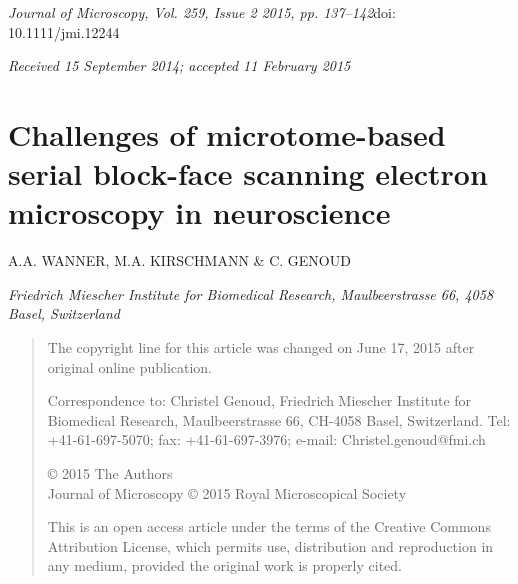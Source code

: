 \documentclass{article}
\begin{document}

\noindent\emph{Journal of Microscopy, Vol. 259, Issue 2 2015, pp. 137–142}\hfill doi: 10.1111/jmi.12244\par
\noindent\emph{Received 15 September 2014; accepted 11 February 2015}\par

\section*{Challenges of microtome-based serial block-face scanning electron microscopy in neuroscience}

\noindent A.A. WANNER, M.A. KIRSCHMANN \& C. GENOUD\par
\noindent\emph{Friedrich Miescher Institute for Biomedical Research, Maulbeerstrasse 66, 4058 Basel, Switzerland}\par

\begin{quote}\small
\noindent The copyright line for this article was changed on June 17, 2015 after original online publication.

\noindent Correspondence to: Christel Genoud, Friedrich Miescher Institute for Biomedical Research, Maulbeerstrasse 66, CH-4058 Basel, Switzerland. Tel: +41-61-697-5070; fax: +41-61-697-3976; e-mail: Christel.genoud@fmi.ch

\noindent © 2015 The Authors\\
Journal of Microscopy © 2015 Royal Microscopical Society

\noindent This is an open access article under the terms of the Creative Commons Attribution License, which permits use, distribution and reproduction in any medium, provided the original work is properly cited.
\end{quote}
\end{document}
